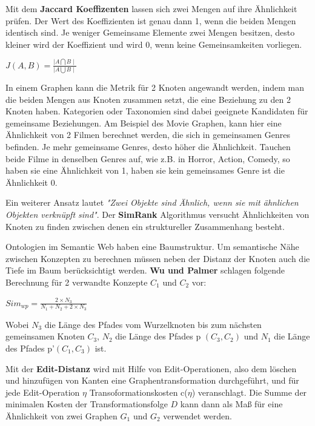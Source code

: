 Mit dem \textbf{Jaccard Koeffizenten} lassen sich zwei Mengen auf ihre Ähnlichkeit prüfen. Der Wert des Koeffizienten ist  genau dann 1, wenn die beiden Mengen identisch sind. Je weniger Gemeinsame Elemente zwei Mengen besitzen, desto kleiner wird der  Koeffizient und wird 0, wenn keine Gemeinsamkeiten vorliegen.
\begin{center}
	$ J(A,B)=\frac{\mid A\bigcap B\mid }{ \mid A \bigcup B \mid }$

\end{center}
In einem Graphen kann die Metrik für 2 Knoten angewandt werden, indem man die beiden Mengen aus Knoten zusammen setzt, die eine Beziehung zu den 2 Knoten haben. Kategorien oder Taxonomien sind dabei geeignete Kandidaten für gemeinsame Beziehungen. Am Beispiel des Movie Graphen, kann hier eine Ähnlichkeit von 2 Filmen berechnet werden, die sich in gemeinsamen Genres befinden. Je mehr gemeinsame Genres, desto höher die Ähnlichkeit. Tauchen beide Filme in denselben Genres auf, wie z.B. in Horror, Action, Comedy, so haben sie eine Ähnlichkeit von 1, haben sie kein gemeinsames Genre ist die Ähnlichkeit 0.
\vspace{1em}

Ein weiterer Ansatz lautet \textit{"Zwei Objekte sind Ähnlich, wenn sie mit ähnlichen Objekten verknüpft sind"}. Der \textbf{SimRank} \cite{Jeh:2002:SMS:775047.775126} Algorithmus versucht Ähnlichkeiten von Knoten zu finden zwischen denen ein struktureller Zusammenhang besteht. 
\vspace{1em}

Ontologien im Semantic Web haben eine Baumstruktur. Um semantische Nähe zwischen Konzepten zu berechnen müssen neben der Distanz der Knoten auch die Tiefe im Baum berücksichtigt werden. \textbf{Wu und Palmer} \cite{Wu:1994:VSL:981732.981751} schlagen folgende Berechnung für 2 verwandte Konzepte $C_{1}$ und $C_{2}$ vor:\par

\begin{center}
	$Sim_{wp}=\frac{2 \times N_{3}}{N_{1} + N_{2} + 2 \times N_{3}}$
\end{center}

Wobei $N_{3}$ die Länge des Pfades vom Wurzelknoten bis zum nächsten gemeinsamen Knoten $C_{3}$, $N_{2}$ die Länge des Pfades p $(C_{3},C_{2})$ und $N_{1}$ die Länge des Pfades p'$(C_{1},C_{3})$ ist.
\vspace{1em}

Mit der \textbf{Edit-Distanz} \cite{Krumke2012} wird mit Hilfe von Edit-Operationen, also dem löschen und hinzufügen von Kanten eine Graphentransformation durchgeführt, und für jede Edit-Operation $\eta$ Transoformationskosten c($\eta$) veranschlagt. Die Summe der minimalen Kosten der Transformationsfolge $D$ kann dann als Maß für eine Ähnlichkeit von zwei Graphen $G_{1}$ und $G_{2}$ verwendet werden.